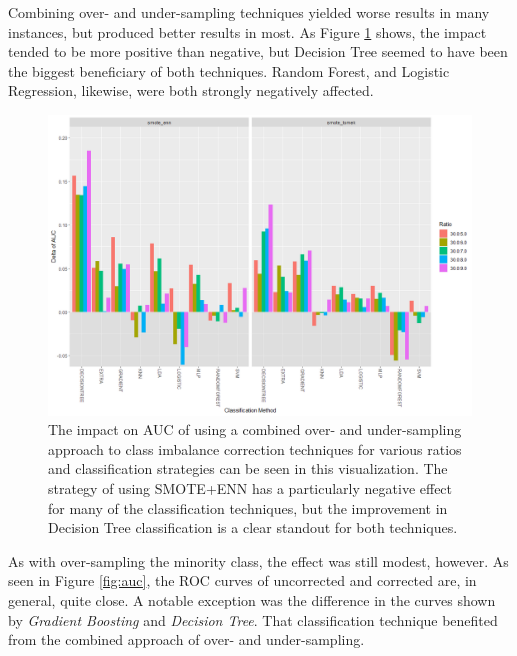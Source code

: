 \documentclass[letterpaper, notitlepage]{report}
\begin{document}
Combining over- and under-sampling techniques yielded worse results in many instances, but produced better results in most. As Figure \ref{fig:combined} shows, the impact tended to be more positive than negative, but Decision Tree seemed to have been the biggest beneficiary of both techniques. Random Forest, and Logistic Regression, likewise, were both strongly negatively affected.
\begin{figure}[H]
	\centering
	\includegraphics[width=0.9\linewidth]{./figures/combined.png}
	\caption[Combined Over and Under-sampling]{The impact on AUC of using a combined over- and under-sampling approach to class imbalance correction techniques for various ratios and classification strategies can be seen in this visualization. The strategy of using SMOTE+ENN has a particularly negative effect for many of the classification techniques, but the improvement in Decision Tree classification is a clear standout for both techniques.}
	\label{fig:combined}
\end{figure}

As with over-sampling the minority class, the effect was still modest, however. As seen in Figure \ref{fig:auc}, the ROC curves of uncorrected and corrected are, in general, quite close.  A notable exception was the difference in the curves shown by \textit{Gradient Boosting} and \textit{Decision Tree}. That classification technique  benefited from the combined approach of over- and under-sampling.
\end{document}
